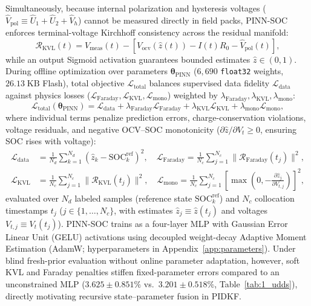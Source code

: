 \documentclass[10pt,a4paper]{article}
\begin{document}
Simultaneously, because internal polarization and hysteresis voltages ($\hat{V}_{\text{pol}} \equiv \hat{U}_1 + \hat{U}_2 + \hat{V}_h$) cannot be measured directly in field packs, PINN-SOC enforces terminal-voltage Kirchhoff consistency across the residual manifold:
\begin{equation}\label{eqn:res_kvl}
\mathcal{R}_{\text{KVL}}(t) = V_{\text{meas}}(t) - \left[ V_{\text{ocv}}(\hat{z}(t)) - I(t) R_0 - \hat{V}_{\text{pol}}(t) \right],
\end{equation}
while an output Sigmoid activation guarantees bounded estimates $\hat{z} \in (0, 1)$. During offline optimization over parameters $\boldsymbol{\theta}_{\text{PINN}}$ ($6,690$ \texttt{float32} weights, $26.13\;\mathrm{KB}$ Flash), total objective $\mathcal{L}_{\text{total}}$ balances supervised data fidelity $\mathcal{L}_{\text{data}}$ against physics losses ($\mathcal{L}_{\text{Faraday}}, \mathcal{L}_{\text{KVL}}, \mathcal{L}_{\text{mono}}$) weighted by $\lambda_{\text{Faraday}}, \lambda_{\text{KVL}}, \lambda_{\text{mono}}$:
\begin{equation}\label{eqn:pinn_loss}
\mathcal{L}_{\text{total}}(\boldsymbol{\theta}_{\text{PINN}}) = \mathcal{L}_{\text{data}} + \lambda_{\text{Faraday}} \mathcal{L}_{\text{Faraday}} + \lambda_{\text{KVL}} \mathcal{L}_{\text{KVL}} + \lambda_{\text{mono}} \mathcal{L}_{\text{mono}},
\end{equation}
where individual terms penalize prediction errors, charge-conservation violations, voltage residuals, and negative OCV--SOC monotonicity ($\partial \hat{z}/\partial V_t \ge 0$, ensuring SOC rises with voltage):
\begin{align}
\mathcal{L}_{\text{data}} &= \frac{1}{N_d} \sum_{k=1}^{N_d} (\hat{z}_k - \text{SOC}_k^{\text{ref}})^2, \quad \mathcal{L}_{\text{Faraday}} = \frac{1}{N_c} \sum_{j=1}^{N_c} \|\mathcal{R}_{\text{Faraday}}(t_j)\|^2, \label{eqn:pinn_loss_data_faraday} \\
\mathcal{L}_{\text{KVL}} &= \frac{1}{N_c} \sum_{j=1}^{N_c} \|\mathcal{R}_{\text{KVL}}(t_j)\|^2, \quad \mathcal{L}_{\text{mono}} = \frac{1}{N_c}\sum_{j=1}^{N_c} \left[\max\left(0, -\frac{\partial \hat{z}_j}{\partial V_{t,j}}\right)\right]^2, \label{eqn:pinn_loss_kvl_mono}
\end{align}
evaluated over $N_d$ labeled samples (reference state $\text{SOC}_k^{\text{ref}}$) and $N_c$ collocation timestamps $t_j$ ($j \in \{1,\dots,N_c\}$, with estimates $\hat{z}_j \equiv \hat{z}(t_j)$ and voltages $V_{t,j} \equiv V_t(t_j)$). PINN-SOC trains as a four-layer MLP with Gaussian Error Linear Unit (GELU) activations using decoupled weight-decay Adaptive Moment Estimation (AdamW; hyperparameters in Appendix~\ref{app:parameters}). Under blind fresh-prior evaluation without online parameter adaptation, however, soft KVL and Faraday penalties stiffen fixed-parameter errors compared to an unconstrained MLP ($3.625\pm0.851\%$ vs.\ $3.201\pm0.518\%$, Table~\ref{tab:1_udds}), directly motivating recursive state--parameter fusion in PIDKF.
\end{document}

